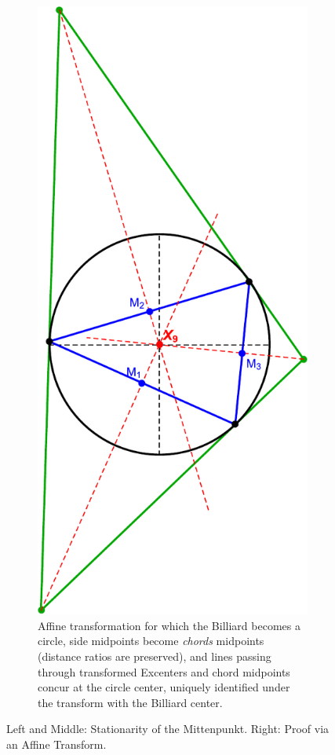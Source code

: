 \begin{figure}[H]
\begin{subfigure}[t]{0.29\textwidth}
         \includegraphics[height=1.75\linewidth]{pics/0053_mitten_rot_scaled.pdf}
         \caption{Affine transformation for which the Billiard becomes a circle, side midpoints become {\em chords} midpoints (distance ratios are preserved), and lines passing through transformed Excenters and chord midpoints concur at the circle center, uniquely identified under the transform with the Billiard center. 
         \label{fig:mitten-proof}}
     \end{subfigure}
     \caption{Left and Middle: Stationarity of the Mittenpunkt. Right: Proof via an Affine Transform.}
\end{figure}

